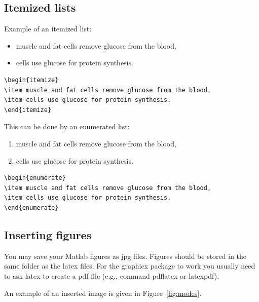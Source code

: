 \documentclass[11pt]{book}
\begin{document}
\subsection{Itemized lists}
Example of an itemized list:
\begin{itemize}
\item muscle and fat cells remove glucose from the blood,
\item cells use glucose for protein synthesis.
\end{itemize}
\begin{verbatim}
\begin{itemize}
\item muscle and fat cells remove glucose from the blood,
\item cells use glucose for protein synthesis.
\end{itemize}
\end{verbatim}
This can be done by an enumerated  list:
\begin{enumerate}
\item muscle and fat cells remove glucose from the blood,
\item cells use glucose for protein synthesis.
\end{enumerate}

\begin{verbatim}
\begin{enumerate}
\item muscle and fat cells remove glucose from the blood,
\item cells use glucose for protein synthesis.
\end{enumerate}
\end{verbatim}



\newpage



\subsection{Inserting figures}


You may save your Matlab figures as jpg files.  Figures should  be stored in the 
same folder as the latex files.
For the graphicx package to work you usually need to ask latex to create a pdf file (e.g., command pdflatex or latexpdf).

An example of an inserted image is given in Figure~\ref{fig:modes}.
\end{document}

